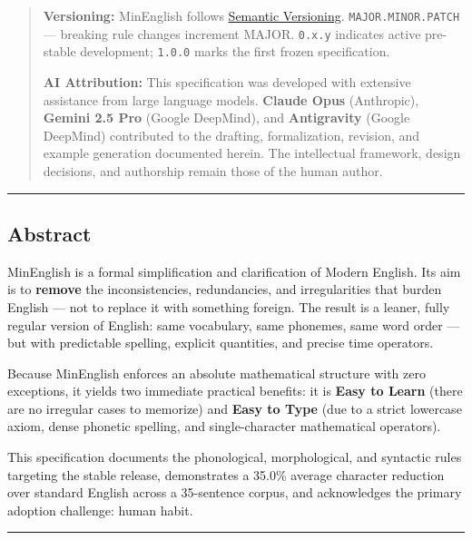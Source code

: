 \newpage

\begin{quote}
\textbf{Versioning:} MinEnglish follows
\href{https://semver.org}{Semantic Versioning}.
\texttt{MAJOR.MINOR.PATCH} --- breaking rule changes increment MAJOR.
\texttt{0.x.y} indicates active pre-stable development; \texttt{1.0.0}
marks the first frozen specification.

\textbf{AI Attribution:} This specification was developed with extensive
assistance from large language models. \textbf{Claude Opus} (Anthropic),
\textbf{Gemini 2.5 Pro} (Google DeepMind), and \textbf{Antigravity}
(Google DeepMind) contributed to the drafting, formalization, revision,
and example generation documented herein. The intellectual framework,
design decisions, and authorship remain those of the human author.
\end{quote}

\begin{center}\rule{0.5\linewidth}{0.5pt}\end{center}

\newpage

\subsection{Abstract}\label{abstract}

MinEnglish is a formal simplification and clarification of Modern
English. Its aim is to \textbf{remove} the inconsistencies,
redundancies, and irregularities that burden English --- not to replace
it with something foreign. The result is a leaner, fully regular version
of English: same vocabulary, same phonemes, same word order --- but with
predictable spelling, explicit quantities, and precise time operators.

Because MinEnglish enforces an absolute mathematical structure with zero
exceptions, it yields two immediate practical benefits: it is
\textbf{Easy to Learn} (there are no irregular cases to memorize) and
\textbf{Easy to Type} (due to a strict lowercase axiom, dense phonetic
spelling, and single-character mathematical operators).

This specification documents the phonological, morphological, and
syntactic rules targeting the stable release, demonstrates a 35.0\%
average character reduction over standard English across a 35-sentence
corpus, and acknowledges the primary adoption challenge: human habit.

\begin{center}\rule{0.5\linewidth}{0.5pt}\end{center}

